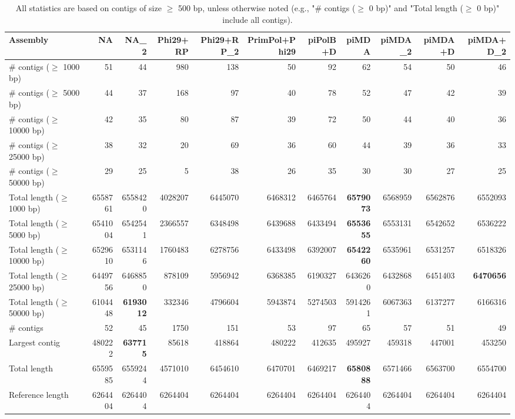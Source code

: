 \documentclass[12pt,a4paper]{article}
\begin{document}
\begin{table}[ht]
\begin{center}
\caption{All statistics are based on contigs of size $\geq$ 500 bp, unless otherwise noted (e.g., "\# contigs ($\geq$ 0 bp)" and "Total length ($\geq$ 0 bp)" include all contigs).}
\begin{tabular}{|l*{10}{|r}|}
\hline
Assembly & NA & NA\_2 & Phi29+RP & Phi29+RP\_2 & PrimPol+Phi29 & piPolB+D & piMDA & piMDA\_2 & piMDA+D & piMDA+D\_2 \\ \hline
\# contigs ($\geq$ 1000 bp) & 51 & 44 & 980 & 138 & 50 & 92 & 62 & 54 & 50 & 46 \\ \hline
\# contigs ($\geq$ 5000 bp) & 44 & 37 & 168 & 97 & 40 & 78 & 52 & 47 & 42 & 39 \\ \hline
\# contigs ($\geq$ 10000 bp) & 42 & 35 & 80 & 87 & 39 & 72 & 50 & 44 & 40 & 36 \\ \hline
\# contigs ($\geq$ 25000 bp) & 38 & 32 & 20 & 69 & 36 & 60 & 44 & 39 & 36 & 33 \\ \hline
\# contigs ($\geq$ 50000 bp) & 29 & 25 & 5 & 38 & 26 & 35 & 30 & 30 & 27 & 25 \\ \hline
Total length ($\geq$ 1000 bp) & 6558761 & 6558420 & 4028207 & 6445070 & 6468312 & 6465764 & {\bf 6579073} & 6568959 & 6562876 & 6552093 \\ \hline
Total length ($\geq$ 5000 bp) & 6541004 & 6542541 & 2366557 & 6348498 & 6439688 & 6433494 & {\bf 6553655} & 6553131 & 6542652 & 6536222 \\ \hline
Total length ($\geq$ 10000 bp) & 6529610 & 6531146 & 1760483 & 6278756 & 6433498 & 6392007 & {\bf 6542260} & 6535961 & 6531257 & 6518326 \\ \hline
Total length ($\geq$ 25000 bp) & 6449756 & 6468850 & 878109 & 5956942 & 6368385 & 6190327 & 6436260 & 6432868 & 6451403 & {\bf 6470656} \\ \hline
Total length ($\geq$ 50000 bp) & 6104448 & {\bf 6193012} & 332346 & 4796604 & 5943874 & 5274503 & 5914261 & 6067363 & 6137277 & 6166316 \\ \hline
\# contigs & 52 & 45 & 1750 & 151 & 53 & 97 & 65 & 57 & 51 & 49 \\ \hline
Largest contig & 480222 & {\bf 637715} & 85618 & 418864 & 480222 & 412635 & 495927 & 459318 & 447001 & 453250 \\ \hline
Total length & 6559585 & 6559244 & 4571010 & 6454610 & 6470701 & 6469217 & {\bf 6580888} & 6571466 & 6563700 & 6554700 \\ \hline
Reference length & 6264404 & 6264404 & 6264404 & 6264404 & 6264404 & 6264404 & 6264404 & 6264404 & 6264404 & 6264404 \\ \hline

\end{tabular}
\end{center}
\end{table}
\end{document}
